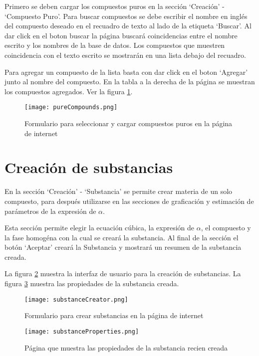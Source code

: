 	Primero se deben cargar los compuestos puros en la sección `Creación' - `Compuesto Puro'. Para buscar compuestos se debe escribir el nombre en inglés del compuesto deseado en el recuadro de texto al lado de la etiqueta `Buscar'. Al dar click en el boton buscar la página buscará coincidencias entre el nombre escrito y los nombres de la base de datos. Los compuestos que muestren coincidencia con el texto escrito se mostrarán en una lista debajo del recuadro.

	Para agregar un compuesto de la lista basta con dar click en el boton `Agregar' junto al nombre del compuesto. En la tabla a la derecha de la página se muestran los compuestos agregados. Ver la figura \ref{fig:pureCompounds}.

	\begin{figure}[!h]
		\centering
		\texttt{[image: pureCompounds.png]}
		\caption{Formulario para seleccionar y cargar compuestos puros en la página de internet}
		\label{fig:pureCompounds}
	\end{figure}

\section{Creación de substancias}\label{sec:webSubstanceCreator}
	
	En la sección `Creación' - `Substancia' se permite crear materia de un solo compuesto, para después utilizarse en las secciones de graficación y estimación de parámetros de la expresión de $\alpha$.

	Esta sección permite elegir la ecuación cúbica, la expresión de $\alpha$, el compuesto y la fase homogéna con la cual se creará la substancia. Al final de la sección el botón `Aceptar' creará la Substancia y mostrará un resumen de la substancia creada.

	La figura \ref{fig:substanceCreator} muestra la interfaz de usuario para la creación de substancias. La figura \ref{fig:substanceProperties} muestra las propiedades de la substancia creada.

	\begin{figure}[!h]
		\texttt{[image: substanceCreator.png]}
		\caption{Formulario para crear substancias en la página de internet}
		\label{fig:substanceCreator}
	\end{figure}

	\begin{figure}[!h]
		\texttt{[image: substanceProperties.png]}
		\caption{Página que muestra las propiedades de la substancia recien creada}
		\label{fig:substanceProperties}
	\end{figure}

